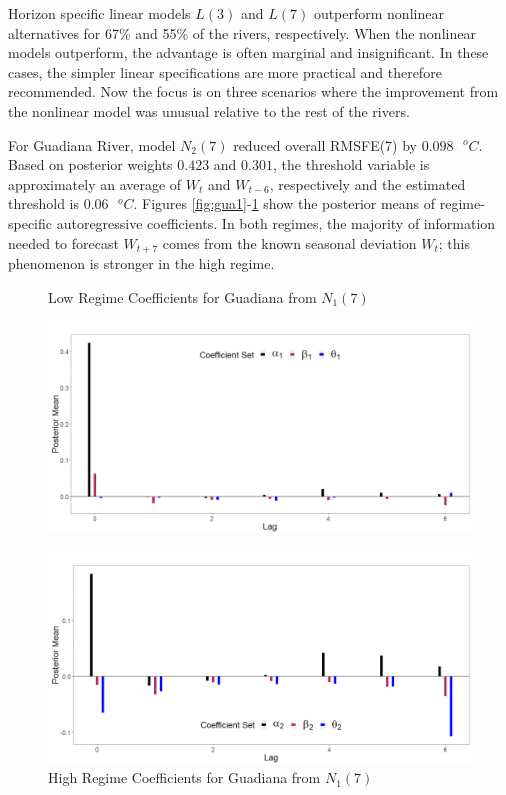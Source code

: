 Horizon specific linear models $L(3)$ and $L(7)$ outperform nonlinear alternatives for 67\% and 55\% of the rivers, respectively. 
When the nonlinear models outperform, the advantage is often marginal and insignificant. In these cases, the simpler linear specifications are more practical and therefore recommended. Now the focus is on three scenarios where the improvement from the nonlinear model was unusual relative to the rest of the rivers.

For Guadiana River, model $N_2(7)$ reduced overall RMSFE(7) by $0.098 \textrm{ }^o C$. Based on posterior weights $0.423$ and $0.301$, the threshold variable is approximately an average of $W_{t}$ and $W_{t-6}$, respectively and the estimated threshold is $0.06 \textrm{ }^o C$. Figures \ref{fig:gua1}-\ref{fig:gua2} show the posterior means of regime-specific autoregressive coefficients. In both regimes, the majority of information needed to forecast $W_{t+7}$ comes from the known seasonal deviation $W_t$; this phenomenon is stronger in the high regime.

\begin{figure}[!h]
\center
\begin{minipage}[h]{\textwidth}
\caption{Low Regime Coefficients for Guadiana from $N_1(7)$}
\label{fig:gua1}
\includegraphics[scale=0.3]{GuadianaL}
\end{minipage} \hspace{\textwidth}
\begin{minipage}[h]{\textwidth}
\caption{High Regime Coefficients for Guadiana from $N_1(7)$}
\label{fig:gua2}
\includegraphics[scale=0.3]{GuadianaH}
\end{minipage}
\end{figure}


